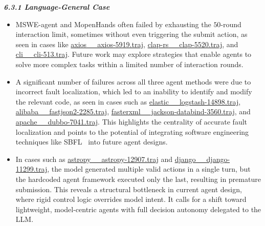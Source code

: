 \documentclass[11pt, a4paper, logo, copyright, nonumbering]{seed}
\newcommand{\msweagent}{MSWE-agent\xspace}
\newcommand{\mopenhands}{MopenHands\xspace}
\begin{document}
\noindent\textit{\textbf{6.3.1 Language-General Case}}
\vspace{-0.3cm}
\begin{itemize}[leftmargin=*]
    \item \msweagent and \mopenhands often failed by exhausting the $50$-round interaction limit, sometimes without even triggering the submit action, as seen in cases like \href{https://github.com/multi-swe-bench/experiments/blob/main/evaluation/javascript/verified/20250329_MSWE-agent_DeepSeek-V3/trajs/axios\_\_axios-5919.traj}{axios\_\_axios-5919.traj}, \href{https://github.com/multi-swe-bench/experiments/blob/main/evaluation/rust/verified/20250329_MSWE-agent_DeepSeek-V3/trajs/clap-rs\_\_clap-5520.traj}{clap-rs\_\_clap-5520.traj}, and \href{https://github.com/multi-swe-bench/experiments/blob/main/evaluation/go/verified/20250329_MopenHands_DeepSeek-R1/trajs/cli\_\_cli-513/DeepSeek-R1-1743467902.7243466.json}{cli\_\_cli-513.traj}.
    Future work may explore strategies that enable agents to solve more complex tasks within a limited number of interaction rounds.
    \item A significant number of failures across all three agent methods were due to incorrect fault localization, which led to an inability to identify and modify the relevant code, as seen in cases such as \href{https://github.com/multi-swe-bench/experiments/blob/main/evaluation/java/verified/20250329_MSWE-agent_DeepSeek-V3/trajs/elastic\_\_logstash-14898.traj}{elastic\_\_logstash-14898.traj},  \href{https://github.com/multi-swe-bench/experiments/blob/main/evaluation/java/verified/20250329_MSWE-agent_DeepSeek-V3/trajs/alibaba\_\_fastjson2-2285.traj}{alibaba\_\_fastjson2-2285.traj}, \href{https://github.com/multi-swe-bench/experiments/blob/main/evaluation/java/verified/20250329_MagentLess_DeepSeek-V3/trajs/fasterxml\_\_jackson-databind-3560.traj}{fasterxml\_\_jackson-databind-3560.traj}, and  \href{https://github.com/multi-swe-bench/experiments/blob/main/evaluation/java/verified/20250329_MopenHands_Claude-3.7-Sonnet/trajs/apache\_\_dubbo-7041/Claude-3.7-Sonnet-1743283670.1144483.json}{apache\_\_dubbo-7041.traj}.
    This highlights the centrality of accurate fault localization and points to the potential of integrating software engineering techniques like SBFL~\citep{sbfl_1,sbfl_2} into future agent designs.
    \item In cases such as \href{https://github.com/multi-swe-bench/experiments/blob/main/evaluation/python/verified/20250329_SWE-agent_DeepSeek-V3/trajs/astropy__astropy-12907.traj}{astropy\_\_astropy-12907.traj} and \href{https://github.com/multi-swe-bench/experiments/blob/main/evaluation/python/verified/20250329_SWE-agent_DeepSeek-V3/trajs/django__django-11299.traj}{django\_\_django-11299.traj}, the model generated multiple valid actions in a single turn, but the hardcoded agent framework executed only the last, resulting in premature submission. This reveals a structural bottleneck in current agent design, where rigid control logic overrides model intent. It calls for a shift toward lightweight, model-centric agents with full decision autonomy delegated to the LLM.

\end{itemize}
\end{document}
